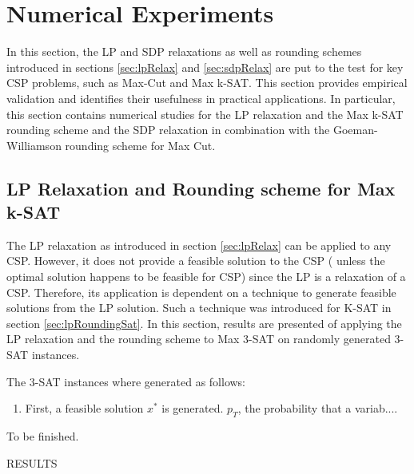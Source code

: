 \section{Numerical Experiments}
In this section, the LP and SDP relaxations as well as rounding schemes introduced in sections \ref{sec:lpRelax} and \ref{sec:sdpRelax} are put to the test for key CSP problems, such as Max-Cut and Max k-SAT. This section provides empirical validation and identifies their usefulness in practical applications. In particular, this section contains numerical studies for the LP relaxation and the Max k-SAT rounding scheme and the SDP relaxation in combination with the Goeman-Williamson rounding scheme for Max Cut. 

\subsection{LP Relaxation and Rounding scheme for Max k-SAT}
The LP relaxation as introduced in section \ref{sec:lpRelax} can be applied to any CSP. However, it does not provide a feasible solution to the CSP ( unless the optimal solution happens to be feasible for CSP) since the LP is a relaxation of a CSP. Therefore, its application is dependent on a technique to generate feasible solutions from the LP solution. Such a technique was introduced for K-SAT in section \ref{sec:lpRoundingSat}. In this section, results are presented of applying the LP relaxation and the rounding scheme to Max 3-SAT on randomly generated 3-SAT instances.

The 3-SAT instances where generated as follows:
\begin{enumerate}
	\item First, a feasible solution $x^*$ is generated. $p_T$, the probability that a variab....
\end{enumerate}

To be finished.

RESULTS

